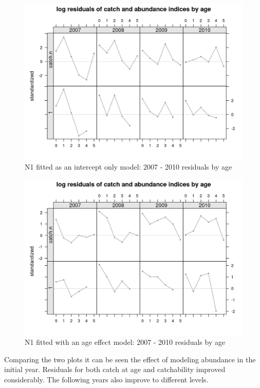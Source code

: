 \documentclass[
]{book}
\begin{document}
\begin{figure}
\centering
\includegraphics{_bookdown_files/_main_files/figure-html/n1resbyage05-1.png}
\caption{\label{fig:n1resbyage05}N1 fitted as an intercept only model: 2007 - 2010 residuals by age}
\end{figure}

\begin{figure}
\centering
\includegraphics{_bookdown_files/_main_files/figure-html/n1resbyage06-1.png}
\caption{\label{fig:n1resbyage06}N1 fitted with an age effect model: 2007 - 2010 residuals by age}
\end{figure}

Comparing the two plots it can be seen the effect of modeling abundance in the initial year. Residuals for both catch at age and catchability improved considerably. The following years also improve to different levels.
\end{document}
